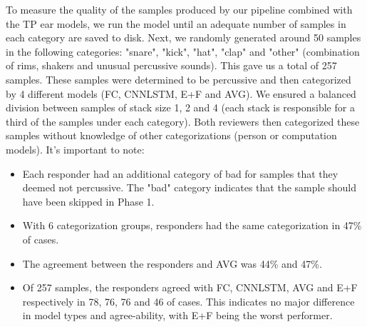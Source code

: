 \documentclass[\main/thesis.tex]{subfiles}
\begin{document}
\begin{table}[htbp]
\caption{\label{kappa_table_TPE}Table of Fleiss' kappa coefficient to measure the degree of agreement between persons (HvH), persons with FC model (H+FC), persons with CNNLSTM model, persons with all models (H+ALL), and between the 3 models. "Drop Rule" column indicates if any samples were dropped. We show the measurements after dropping samples if they are deemed bad by either or both responders. We also show measurements after dropping the "other" category along with samples deemed bad by either responder. }
\end{table}
To measure the quality of the samples produced by our pipeline combined with the TP ear models, we run the model until an adequate number of samples in each category are saved to disk. Next, we randomly generated around 50 samples in the following categories: "snare", "kick", "hat", "clap" and "other" (combination of rims, 
shakers and unusual percussive sounds). This gave us a total of 257 samples. These samples were determined to be percussive and then categorized by 4 different models (FC, CNNLSTM, E+F and AVG). We ensured a balanced division between samples of stack size 1, 2 and 4 (each stack is responsible for a third of the samples under each category). Both reviewers then categorized these samples without knowledge of other categorizations (person or computation models). It's important to note:
\begin{itemize}
    \item Each responder had an additional category of bad for samples that they deemed not percussive. The "bad" category indicates that the sample should have been skipped in Phase 1. 
    \item With 6 categorization groups, responders had the same categorization in 47\% of cases.
    \item The agreement between the responders and AVG was 44\% and 47\%.
    \item Of 257 samples, the responders agreed with FC, CNNLSTM, AVG and E+F respectively in 78, 76, 76 and 46 of cases. This indicates no major difference in model types and agree-ability, with E+F being the worst performer.
\end{itemize}
\end{document}
